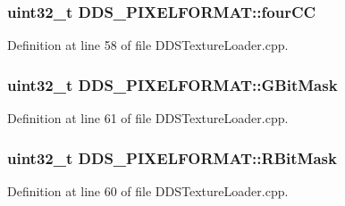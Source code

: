 \subsubsection[{\texorpdfstring{four\+CC}{fourCC}}]{\setlength{\rightskip}{0pt plus 5cm}uint32\+\_\+t D\+D\+S\+\_\+\+P\+I\+X\+E\+L\+F\+O\+R\+M\+A\+T\+::four\+CC}\hypertarget{struct_d_d_s___p_i_x_e_l_f_o_r_m_a_t_aa7af0012c64480e8eeafa25d7892c310_aa7af0012c64480e8eeafa25d7892c310}{}\label{struct_d_d_s___p_i_x_e_l_f_o_r_m_a_t_aa7af0012c64480e8eeafa25d7892c310_aa7af0012c64480e8eeafa25d7892c310}


Definition at line 58 of file D\+D\+S\+Texture\+Loader.\+cpp.

\subsubsection[{\texorpdfstring{G\+Bit\+Mask}{GBitMask}}]{\setlength{\rightskip}{0pt plus 5cm}uint32\+\_\+t D\+D\+S\+\_\+\+P\+I\+X\+E\+L\+F\+O\+R\+M\+A\+T\+::\+G\+Bit\+Mask}\hypertarget{struct_d_d_s___p_i_x_e_l_f_o_r_m_a_t_a13f1281d9cb4a6e001541c78d58ead8b_a13f1281d9cb4a6e001541c78d58ead8b}{}\label{struct_d_d_s___p_i_x_e_l_f_o_r_m_a_t_a13f1281d9cb4a6e001541c78d58ead8b_a13f1281d9cb4a6e001541c78d58ead8b}


Definition at line 61 of file D\+D\+S\+Texture\+Loader.\+cpp.

\subsubsection[{\texorpdfstring{R\+Bit\+Mask}{RBitMask}}]{\setlength{\rightskip}{0pt plus 5cm}uint32\+\_\+t D\+D\+S\+\_\+\+P\+I\+X\+E\+L\+F\+O\+R\+M\+A\+T\+::\+R\+Bit\+Mask}\hypertarget{struct_d_d_s___p_i_x_e_l_f_o_r_m_a_t_a2d2f8c19c50ceb8677b0be2d1090c234_a2d2f8c19c50ceb8677b0be2d1090c234}{}\label{struct_d_d_s___p_i_x_e_l_f_o_r_m_a_t_a2d2f8c19c50ceb8677b0be2d1090c234_a2d2f8c19c50ceb8677b0be2d1090c234}


Definition at line 60 of file D\+D\+S\+Texture\+Loader.\+cpp.

